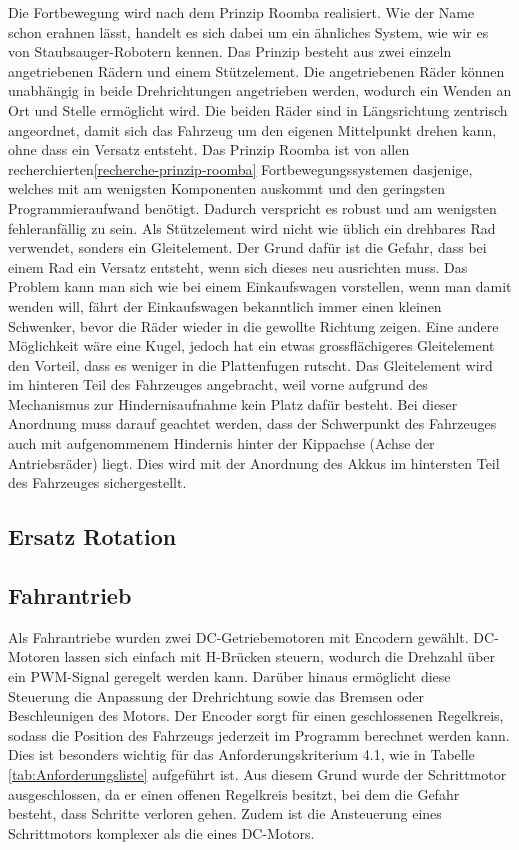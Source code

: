 \documentclass[../main.tex]{subfiles}
\begin{document}
Die Fortbewegung wird nach dem Prinzip Roomba realisiert. Wie der Name schon erahnen lässt, handelt es sich dabei um ein ähnliches System, wie wir es von Staubsauger-Robotern kennen. Das Prinzip besteht aus zwei einzeln angetriebenen Rädern und einem Stützelement. Die angetriebenen Räder können unabhängig in beide Drehrichtungen angetrieben werden, wodurch ein Wenden an Ort und Stelle ermöglicht wird. Die beiden Räder sind in Längsrichtung zentrisch angeordnet, damit sich das Fahrzeug um den eigenen Mittelpunkt drehen kann, ohne dass ein Versatz entsteht. Das Prinzip Roomba ist von allen recherchierten\ref{recherche-prinzip-roomba} Fortbewegungssystemen dasjenige, welches mit am wenigsten Komponenten auskommt und den geringsten Programmieraufwand benötigt. Dadurch verspricht es robust und am wenigsten fehleranfällig zu sein. Als Stützelement wird nicht wie üblich ein drehbares Rad verwendet, sonders ein Gleitelement. Der Grund dafür ist die Gefahr, dass bei einem Rad ein Versatz entsteht, wenn sich dieses neu ausrichten muss. Das Problem kann man sich wie bei einem Einkaufswagen vorstellen, wenn man damit wenden will, fährt der Einkaufswagen bekanntlich immer einen kleinen Schwenker, bevor die Räder wieder in die gewollte Richtung zeigen. Eine andere Möglichkeit wäre eine Kugel, jedoch hat ein etwas grossflächigeres Gleitelement den Vorteil, dass es weniger in die Plattenfugen rutscht. Das Gleitelement wird im hinteren Teil des Fahrzeuges angebracht, weil vorne aufgrund des Mechanismus zur Hindernisaufnahme kein Platz dafür besteht. Bei dieser Anordnung muss darauf geachtet werden, dass der Schwerpunkt des Fahrzeuges auch mit aufgenommenem Hindernis hinter der Kippachse (Achse der Antriebsräder) liegt. Dies wird mit der Anordnung des Akkus im hintersten Teil des Fahrzeuges sichergestellt.

\subsection{Ersatz Rotation}    %



\subsection{Fahrantrieb}
Als Fahrantriebe wurden zwei DC-Getriebemotoren mit Encodern gewählt. DC-Motoren lassen sich einfach mit H-Brücken steuern, wodurch die Drehzahl über ein PWM-Signal geregelt werden kann. Darüber hinaus ermöglicht diese Steuerung die Anpassung der Drehrichtung sowie das Bremsen oder Beschleunigen des Motors. Der Encoder sorgt für einen geschlossenen Regelkreis, sodass die Position des Fahrzeugs jederzeit im Programm berechnet werden kann. Dies ist besonders wichtig für das Anforderungskriterium 4.1, wie in Tabelle \ref{tab:Anforderungsliste} aufgeführt ist. Aus diesem Grund wurde der Schrittmotor ausgeschlossen, da er einen offenen Regelkreis besitzt, bei dem die Gefahr besteht, dass Schritte verloren gehen. Zudem ist die Ansteuerung eines Schrittmotors komplexer als die eines DC-Motors.
\end{document}
